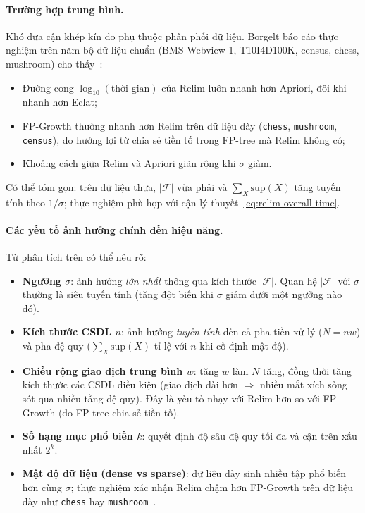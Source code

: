 \documentclass[12pt,a4paper]{report}
\begin{document}
\paragraph{Trường hợp trung bình.}
Khó đưa cận khép kín do phụ thuộc phân phối dữ liệu. Borgelt báo cáo thực
nghiệm trên năm bộ dữ liệu chuẩn (BMS-Webview-1, T10I4D100K, census, chess,
mushroom) cho thấy~\cite[Section~3]{borgelt2005}:
\begin{itemize}
    \item Đường cong $\log_{10}(\text{thời gian})$ của Relim luôn nhanh hơn
    Apriori, đôi khi nhanh hơn Eclat;
    \item FP-Growth thường nhanh hơn Relim trên dữ liệu dày
    (\texttt{chess}, \texttt{mushroom}, \texttt{census}), do hưởng lợi từ chia
    sẻ tiền tố trong FP-tree mà Relim không có;
    \item Khoảng cách giữa Relim và Apriori giãn rộng khi $\sigma$ giảm.
\end{itemize}
Có thể tóm gọn: trên dữ liệu thưa, $|\mathcal{F}|$ vừa phải và
$\sum_X \mathrm{sup}(X)$ tăng tuyến tính theo $1/\sigma$; thực nghiệm phù hợp
với cận lý thuyết~\eqref{eq:relim-overall-time}.

\paragraph{Các yếu tố ảnh hưởng chính đến hiệu năng.}
Từ phân tích trên có thể nêu rõ:
\begin{itemize}
    \item \textbf{Ngưỡng $\sigma$}: ảnh hưởng \textit{lớn nhất} thông qua kích
    thước $|\mathcal{F}|$. Quan hệ $|\mathcal{F}|$ với $\sigma$ thường là siêu
    tuyến tính (tăng đột biến khi $\sigma$ giảm dưới một ngưỡng nào đó).
    \item \textbf{Kích thước CSDL $n$}: ảnh hưởng \textit{tuyến tính} đến cả
    pha tiền xử lý ($N = nw$) và pha đệ quy ($\sum_X \mathrm{sup}(X)$ tỉ lệ
    với $n$ khi cố định mật độ).
    \item \textbf{Chiều rộng giao dịch trung bình $w$}: tăng $w$ làm $N$ tăng,
    đồng thời tăng kích thước các CSDL điều kiện (giao dịch dài hơn $\Rightarrow$
    nhiều mắt xích sống sót qua nhiều tầng đệ quy). Đây là yếu tố nhạy với
    Relim hơn so với FP-Growth (do FP-tree chia sẻ tiền tố).
    \item \textbf{Số hạng mục phổ biến $k$}: quyết định độ sâu đệ quy tối đa và
    cận trên xấu nhất $2^k$.
    \item \textbf{Mật độ dữ liệu (dense vs sparse)}: dữ liệu dày sinh nhiều
    tập phổ biến hơn cùng $\sigma$; thực nghiệm xác nhận Relim chậm hơn
    FP-Growth trên dữ liệu dày như \texttt{chess} hay
    \texttt{mushroom}~\cite[Figures 5-6]{borgelt2005}.
\end{itemize}
\end{document}
